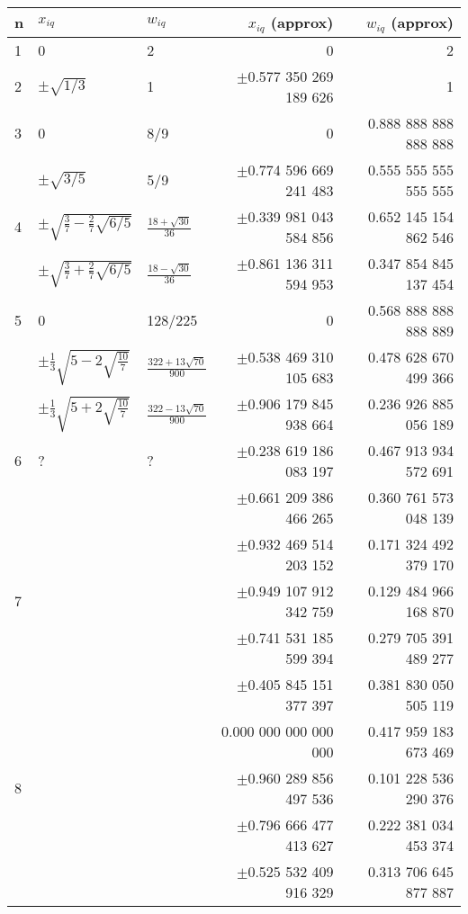 \begin{center}
\begin{tabular}{lllrr}
\hline
n & $x_{iq}$ & $w_{iq}$ & $x_{iq}$ (approx) & $w_{iq}$ (approx) \\
\hline\hline
1 & 0 & 2 & 0 & 2 \\
\hline
2 & $\pm \sqrt{1/3}$ & 1  & $\pm$0.577 350 269 189 626 & 1 \\
\hline
3 & 0 & 8/9 & 0                                          & 0.888 888 888 888 888 \\
  & $\pm\sqrt{3/5}$  & 5/9  & $\pm$0.774 596 669 241 483 & 0.555 555 555 555 555 \\
\hline
4 & $\pm\sqrt{\frac{3}{7} - \frac{2}{7}\sqrt{6/5}}$  & $\frac{18+\sqrt{30}}{36}$ & $\pm$0.339 981 043 584 856 & 0.652 145 154 862 546 \\
  & $\pm\sqrt{\frac{3}{7} + \frac{2}{7}\sqrt{6/5}}$  & $\frac{18-\sqrt{30}}{36}$ & $\pm$0.861 136 311 594 953 & 0.347 854 845 137 454 \\
\hline
5 & 0 & 128/225                                    & 0                                                          & 0.568 888 888 888 889 \\
  & $\pm\frac{1}{3}\sqrt{5-2\sqrt{\frac{10}{7}}}$  & $\frac{322+13\sqrt{70}}{900}$ & $\pm$0.538 469 310 105 683 & 0.478 628 670 499 366 \\
  & $\pm\frac{1}{3}\sqrt{5+2\sqrt{\frac{10}{7}}}$  & $\frac{322-13\sqrt{70}}{900}$ & $\pm$0.906 179 845 938 664 & 0.236 926 885 056 189 \\
\hline
6 & ?& ?& $\pm$0.238 619 186 083 197 & 0.467 913 934 572 691\\
  &  &  & $\pm$0.661 209 386 466 265 & 0.360 761 573 048 139\\
  &  &  & $\pm$0.932 469 514 203 152 & 0.171 324 492 379 170\\
\hline
7 & & & $\pm$0.949 107 912 342 759 & 0.129 484 966 168 870\\
  & & & $\pm$0.741 531 185 599 394 & 0.279 705 391 489 277\\
  & & & $\pm$0.405 845 151 377 397 & 0.381 830 050 505 119\\
  & & & 0.000 000 000 000 000 & 0.417 959 183 673 469\\
\hline
8 & & & $\pm$0.960 289 856 497 536 & 0.101 228 536 290 376\\
  & & & $\pm$0.796 666 477 413 627 & 0.222 381 034 453 374\\
  & & & $\pm$0.525 532 409 916 329 & 0.313 706 645 877 887\\

\end{tabular}
\end{center}
